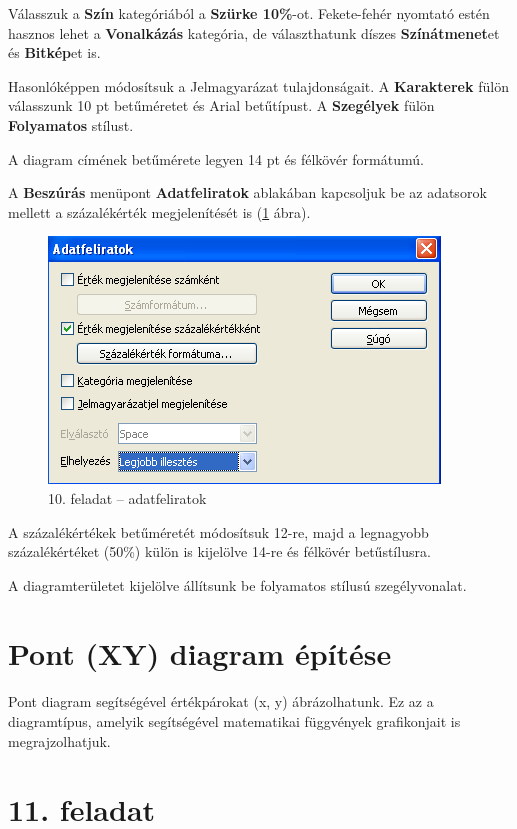 \clearpage
Válasszuk a \textbf{Szín} kategóriából a \textbf{Szürke
10\%}-ot. Fekete-fehér nyomtató estén hasznos lehet a
\textbf{Vonalkázás} kategória, de választhatunk díszes
\textbf{Színátmenet}et és \textbf{Bitkép}et is.

Hasonlóképpen módosítsuk a Jelmagyarázat tulajdonságait. A
\textbf{Karakterek} fülön válasszunk 10 pt betűméretet és
Arial betűtípust. A \textbf{Szegélyek} fülön
\textbf{Folyamatos} stílust.

A diagram címének betűmérete legyen 14 pt és félkövér
formátumú.

A \textbf{Beszúrás} menüpont \textbf{Adatfeliratok} ablakában
kapcsoljuk be az adatsorok mellett a százalékérték
 megjelenítését is (\ref{10-feladatFeliratok} ábra).

\begin{figure}[!h]
\begin{center}
\includegraphics[width=10.398cm]{oocalcv2-img63.png}
\caption{10.  feladat --  adatfeliratok}\label{10-feladatFeliratok}
\end{center}
\end{figure}

A százalékértékek betűméretét módosítsuk 12-re, majd
a legnagyobb százalékértéket (50\%) külön is kijelölve
14-re és félkövér betűstílusra.

A diagramterületet kijelölve állítsunk be folyamatos stílusú
szegélyvonalat.


\section{Pont (XY) diagram építése}

Pont diagram segítségével értékpárokat (x, y)
ábrázolhatunk. Ez az a diagramtípus, amelyik segítségével
matematikai függvények grafikonjait is megrajzolhatjuk. 


\section[11. feladat]{11. feladat}

